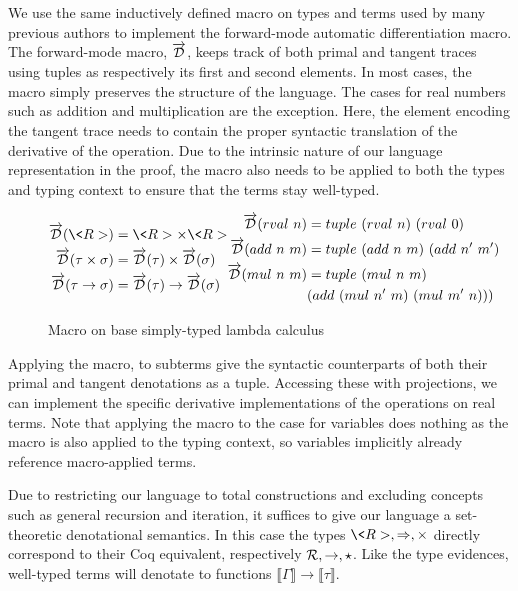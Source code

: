   We use the same inductively defined macro on types and terms used by many previous authors to implement the forward-mode automatic differentiation macro\cite{huot2020correctness}\cite{barthe2020versatility}\cite{Shaikha2019}.
  The forward-mode macro, $\overrightarrow{\mathcal{D}}$, keeps track of both primal and tangent traces using tuples as respectively its first and second elements.
  In most cases, the macro simply preserves the structure of the language.
  The cases for real numbers such as addition and multiplication are the exception.
  Here, the element encoding the tangent trace needs to contain the proper syntactic translation of the derivative of the operation.
  Due to the intrinsic nature of our language representation in the proof, the macro also needs to be applied to both the types and typing context to ensure that the terms stay well-typed.

  \begin{figure}[H]
    \centering
    \begin{equation*}
      \begin{split}
        \D(\<R>) &= \<R> \times \<R> \\
        \D(\tau \times \sigma) &= \D(\tau) \times \D(\sigma) \\
        \D(\tau \rightarrow \sigma) &= \D(\tau) \rightarrow \D(\sigma)
      \end{split}
      \begin{split}
        \D(\rval{n}) &= \tuple{(\rval{n})}{(\rval{0})} \\
        \D(\add{n}{m}) &= \tuple{(\add{n}{m})}{(\add{n'}{m'})} \\
        \D(\mul{n}{m}) &= \tuple{(\mul{n}{m})} \\
          &{(\add{(\mul{n'}{m})}{(\mul{m'}{n})})})
      \end{split}
    \end{equation*}
    \caption{Macro on base simply-typed lambda calculus}
    \label{eqn:macro_base}
  \end{figure}

  Applying the macro, to subterms give the syntactic counterparts of both their primal and tangent denotations as a tuple.
  Accessing these with projections, we can implement the specific derivative implementations of the operations on real terms.
  Note that applying the macro to the case for variables does nothing as the macro is also applied to the typing context, so variables implicitly already reference macro-applied terms.

  Due to restricting our language to total constructions and excluding concepts such as general recursion and iteration, it suffices to give our language a set-theoretic denotational semantics.
  In this case the types $\<R>, \Rightarrow, \times$ directly correspond to their Coq equivalent, respectively $\mathcal{R}, \rightarrow, \star$.
  Like the type evidences, well-typed terms will denotate to functions $\llbracket \Gamma \rrbracket \rightarrow \llbracket \tau \rrbracket$.

